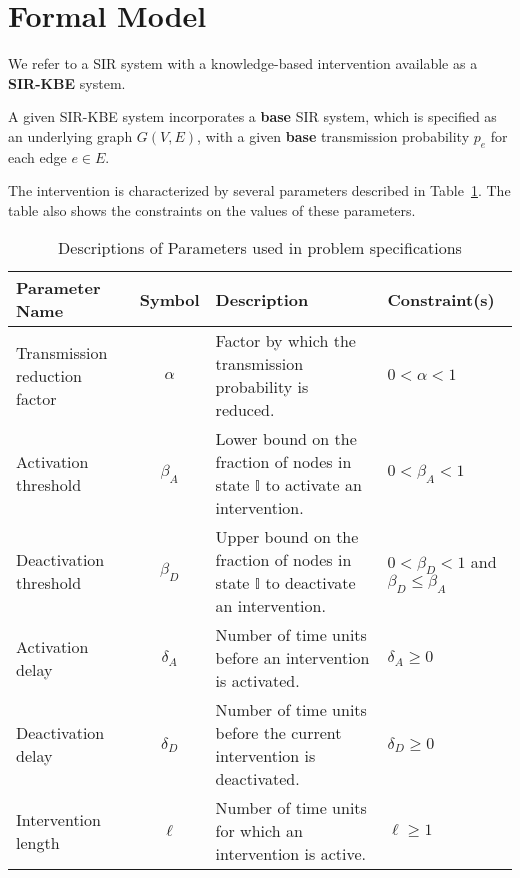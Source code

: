 \documentclass[11pt]{article}
\newcommand{\istate}{\mbox{$\mathbb{I}$}}
\begin{document}
\section{Formal Model}
\label{sec:formal_model}

We refer to a SIR system with a knowledge-based intervention available
as a {\bf SIR-KBE} system.

A given SIR-KBE system incorporates a {\bf base} SIR system,
which is specified as an underlying graph $G(V,E)$, with
a given {\bf base} transmission probability $p_e$ for each edge $e \in E$. 
 
The intervention is characterized by several parameters described in
Table~\ref{tab:parameters}.
The table also shows the constraints on the values of 
these parameters.

\smallskip

\begin{table}[h]
\begin{center}
\begin{tabular}{|p{1.5in}|c|p{2in}|p{1in}|}\hline
\textbf{Parameter Name} & \textbf{Symbol} & \textbf{Description} 
                   & \textbf{Constraint(s)} \\ \hline\hline
{Transmission reduction factor} & $\alpha$ 
      & {Factor by which the transmission probability is reduced.}
      & $0 < \alpha < 1$ \\ \hline
Activation threshold & $\beta_A$
      & {Lower bound on the fraction of nodes in state \istate{} 
         to activate an intervention.}
      & $0 < \beta_A < 1$ \\ \hline
Deactivation threshold & $\beta_D$
      & {Upper bound on the fraction of nodes in state \istate{}
         to deactivate an intervention.}
      & $0 < \beta_D < 1$ and  $\beta_D \leq \beta_A$ \\ \hline
Activation delay & $\delta_A$ 
      & {Number of time units before an intervention is activated.}
      & $\delta_A  \geq 0$ \\ \hline
Deactivation delay & $\delta_D$ 
      & {Number of time units before the current intervention 
         is deactivated.}
      & $\delta_D \geq 0$ \\ \hline
Intervention length & $\ell$ 
      & {Number of time units for which an intervention is active.}
      & $\ell \geq 1$ \\ \hline
\end{tabular}
\end{center}
\caption{Descriptions of Parameters used in problem specifications} 
\label{tab:parameters}
\end{table}
\end{document}
